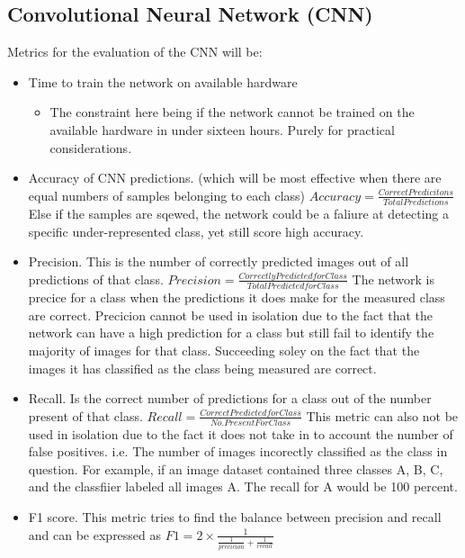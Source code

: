   \subsection{Convolutional Neural Network (CNN)}
  Metrics for the evaluation of the CNN will be:
  \begin{itemize}
    \item Time to train the network on available hardware
    \begin{itemize}
      \item The constraint here being if the network cannot be trained on the available hardware in under sixteen hours. Purely for practical considerations.
    \end{itemize}
    \item Accuracy of CNN predictions. (which will be most effective when there are equal numbers of samples belonging to each class) $Accuracy = \frac{Correct Predicitons}{Total Predictions}$ Else if the samples are sqewed, the network could be a faliure at detecting a specific under-represented class, yet still score high accuracy.
    \item Precision. This is the number of correctly predicted images out of all predictions of that class. $Precision = \frac{Correctly Predicted for Class}{Total Predicted for Class}$ The network is precice for a class when the predictions it does make for the measured class are correct. Precicion cannot be used in isolation due to the fact that the network can have a high prediction for a class but still fail to identify the majority of images for that class. Succeeding soley on the fact that the images it has classified as the class being measured are correct.
    \item Recall. Is the correct number of predictions for a class out of the number present of that class. $Recall = \frac{Correct Predicted for Class}{No. Present For Class}$
    This metric can also not be used in isolation due to the fact it does not take in to account the number of false positives. i.e. The number of images incorectly classified as the class in question. For example, if an image dataset contained three classes A, B, C, and the classfiier labeled all images A. The recall for A would be 100 percent.
    \item F1 score. This metric tries to find the balance between precision and recall and can be expressed as $F1 = 2 \times \frac{1}{\frac{1}{precicion} + \frac{1}{recall}}$
  \end{itemize}
